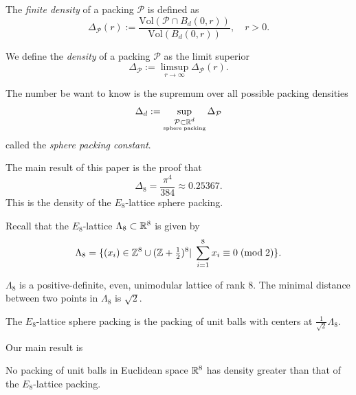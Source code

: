 \begin{definition}\label{def: finite density}\leanok
  The \emph{finite density} of a packing $\mathcal{P}$ is defined as
$$\Delta_{\mathcal{P}}(r):=\frac{\mathrm{Vol}(\mathcal{P}\cap B_d(0,r))}{\mathrm{Vol}(B_d(0,r))},\quad r>0.$$
\end{definition}

\begin{definition}\label{def: density}\leanok
  We define the \emph{density} of a packing $\mathcal{P}$ as the limit superior
$$\Delta_{\mathcal{P}}:=\limsup\limits_{r\to\infty}\Delta_{\mathcal{P}}(r). $$
\end{definition}

\begin{definition}\label{def: Sphere Packing Constant}\leanok
The number be want to know is the supremum over all possible packing densities
$$\Delta_d:=\sup\limits_{\substack{\mathcal{P}\subset\mathbb{R}^d\\ \scriptscriptstyle\mathrm{sphere}\;\mathrm{packing}}}\Delta_{\mathcal{P}} $$
called the \emph{sphere packing constant}.
\end{definition}

The main result of this paper is the proof that $$\Delta_8=\frac{\pi^4}{384}\approx 0.25367.$$
This is the density of the $E_8$-lattice sphere packing.
\begin{definition}\label{def: E8 lattice}
  Recall that the $E_8$-lattice $\Lambda_8\subset\mathbb{R}^8$ is given by
$$\Lambda_8=\{(x_i)\in\mathbb{Z}^8\cup(\mathbb{Z}+\textstyle\frac12\displaystyle )^8|\;\sum_{i=1}^8x_i\equiv 0\;(\mathrm{mod\;2})\}.$$
\end{definition}
\begin{lemma}\label{lemma: Characterisation of E8 lattice}
  $\Lambda_8$ is a positive-definite, even, unimodular lattice of rank 8. The minimal distance between two points in $\Lambda_8$ is $\sqrt{2}$.
\end{lemma}
\begin{definition}\label{def: E8 lattice packing}
The $E_8$-lattice sphere packing is the packing of unit balls with centers at $\frac{1}{\sqrt{2}}\Lambda_8.$
\end{definition}
Our main result is
\begin{theorem}\label{thm: main}
No packing of unit balls
in Euclidean space $\mathbb{R}^8$ has density greater than that of the $E_8$-lattice packing.
\end{theorem}

